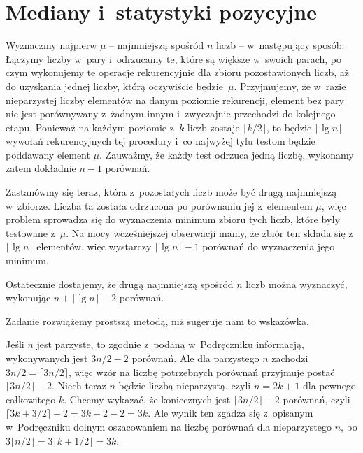 \chapter{Mediany i~statystyki pozycyjne}


\exercise %
Wyznaczmy najpierw $\mu$ -- najmniejszą spośród $n$ liczb -- w~następujący sposób.
Łączymy liczby w~pary i~odrzucamy te, które są większe w~swoich parach, po czym wykonujemy te operacje rekurencyjnie dla zbioru pozostawionych liczb, aż do uzyskania jednej liczby, którą oczywiście będzie~$\mu$.
Przyjmujemy, że w~razie nieparzystej liczby elementów na danym poziomie rekurencji, element bez pary nie jest porównywany z~żadnym innym i~zwyczajnie przechodzi do kolejnego etapu.
Ponieważ na każdym poziomie z~$k$ liczb zostaje $\lceil k/2\rceil$, to będzie $\lceil\lg n\rceil$ wywołań rekurencyjnych tej procedury i~co najwyżej tylu testom będzie poddawany element $\mu$.
Zauważmy, że każdy test odrzuca jedną liczbę, wykonamy zatem dokładnie $n-1$ porównań.

Zastanówmy się teraz, która z~pozostałych liczb może być drugą najmniejszą w~zbiorze.
Liczba ta została odrzucona po porównaniu jej z~elementem $\mu$, więc problem sprowadza się do wyznaczenia minimum zbioru tych liczb, które były testowane z~$\mu$.
Na mocy wcześniejszej obserwacji mamy, że zbiór ten składa się z~$\lceil\lg n\rceil$ elementów, więc wystarczy $\lceil\lg n\rceil-1$ porównań do wyznaczenia jego minimum.

Ostatecznie dostajemy, że drugą najmniejszą spośród $n$ liczb można wyznaczyć, wykonując $n+\lceil\lg n\rceil-2$ porównań.

\exercise %
Zadanie rozwiążemy prostszą metodą, niż sugeruje nam to wskazówka.

Jeśli $n$ jest parzyste, to zgodnie z~podaną w~Podręczniku informacją, wykonywanych jest $3n/2-2$ porównań.
Ale dla parzystego $n$ zachodzi $3n/2=\lceil3n/2\rceil$, więc wzór na liczbę potrzebnych porównań przyjmuje postać $\lceil3n/2\rceil-2$.
Niech teraz $n$ będzie liczbą nieparzystą, czyli $n=2k+1$ dla pewnego całkowitego $k$.
Chcemy wykazać, że koniecznych jest $\lceil3n/2\rceil-2$ porównań, czyli $\lceil3k+3/2\rceil-2=3k+2-2=3k$.
Ale wynik ten zgadza się z~opisanym w~Podręczniku dolnym oszacowaniem na liczbę porównań dla nieparzystego $n$, bo $3\lfloor n/2\rfloor=3\lfloor k+1/2\rfloor=3k$.


